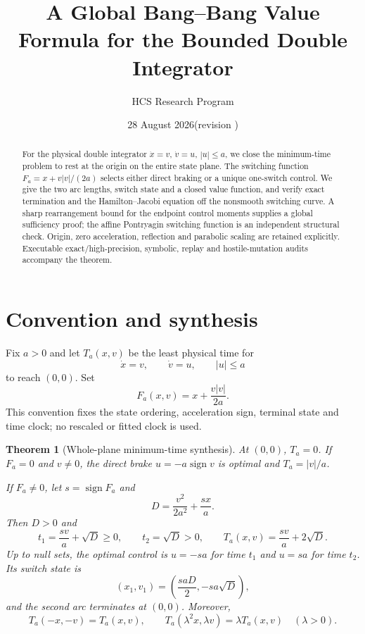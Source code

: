 \documentclass[11pt]{article}
\title{A Global Bang--Bang Value Formula for the Bounded Double Integrator}
\author{HCS Research Program}
\date{28 August 2026\quad (revision \CRevisionRound)}
\newtheorem{theorem}{Theorem}
\begin{document}
\maketitle

\begin{abstract}
For the physical double integrator $\dot x=v$, $\dot v=u$, $|u|\leq a$,
we close the minimum-time problem to rest at the origin on the entire state
plane.  The switching function $F_a=x+v|v|/(2a)$ selects either direct braking
or a unique one-switch control.  We give the two arc lengths, switch state and
a closed value function, and verify exact termination and the Hamilton--Jacobi
equation off the nonsmooth switching curve.  A sharp rearrangement bound for
the endpoint control moments supplies a global sufficiency proof; the affine
Pontryagin switching function is an independent structural check.  Origin,
zero acceleration, reflection and parabolic scaling are retained explicitly.
Executable exact/high-precision, symbolic, replay and hostile-mutation audits
accompany the theorem.
\end{abstract}

\section{Convention and synthesis}
Fix $a>0$ and let $T_a(x,v)$ be the least physical time for
\[
 \dot x=v,\qquad \dot v=u,\qquad |u|\leq a
\]
to reach $(0,0)$.  Set
\[
 F_a(x,v)=x+\frac{v|v|}{2a}.
\]
This convention fixes the state ordering, acceleration sign, terminal state
and time clock; no rescaled or fitted clock is used.

\begin{theorem}[Whole-plane minimum-time synthesis]\label{thm:main}
At $(0,0)$, $T_a=0$.  If $F_a=0$ and $v\ne0$, the direct brake
$u=-a\operatorname{sign}v$ is optimal and $T_a=|v|/a$.

If $F_a\ne0$, let $s=\operatorname{sign}F_a$ and
\[
 D=\frac{v^2}{2a^2}+\frac{sx}{a}.
\]
Then $D>0$ and
\[
 t_1=\frac{sv}{a}+\sqrt D\geq0,\qquad t_2=\sqrt D>0,
 \qquad T_a(x,v)=\frac{sv}{a}+2\sqrt D.                 \tag{1}
\]
Up to null sets, the optimal control is $u=-sa$ for time $t_1$ and
$u=sa$ for time $t_2$.  Its switch state is
\[
 (x_1,v_1)=\left(\frac{saD}{2},-sa\sqrt D\right),       \tag{2}
\]
and the second arc terminates at $(0,0)$.  Moreover,
\[
 T_a(-x,-v)=T_a(x,v),\qquad
 T_a(\lambda^2x,\lambda v)=\lambda T_a(x,v)\quad(\lambda>0). \tag{3}
\]
\end{theorem}
\end{document}
